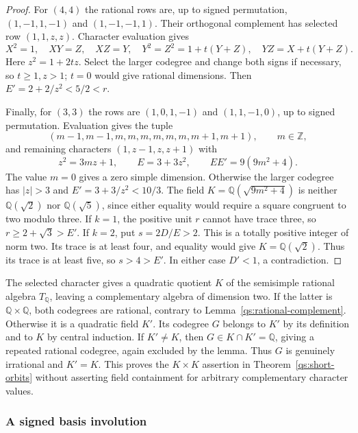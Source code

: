 \documentclass[11pt,a4paper]{article}
\theoremstyle{definition}\newtheorem{definition}[theorem]{Definition}
\theoremstyle{remark}\newtheorem{remark}[theorem]{Remark}
\newcommand{\Q}{\mathbb Q}
\newcommand{\ZZ}{\mathbb Z}
\numberwithin{equation}{section}
\begin{document}
\begin{proof}
For $(4,4)$ the rational rows are, up to signed permutation,
$(1,-1,1,-1)$ and $(1,-1,-1,1)$. Their orthogonal complement has
selected row $(1,1,z,z)$. Character evaluation gives
\[
 X^2=1,\quad XY=Z,\quad XZ=Y,\quad
 Y^2=Z^2=1+t(Y+Z),\quad YZ=X+t(Y+Z).
\]
Here $z^2=1+2tz$. Select the larger codegree and change both signs
if necessary, so $t\ge1,z>1$; $t=0$ would give rational dimensions.
Then $E'=2+2/z^2<5/2<r$.

Finally, for $(3,3)$ the rows are
$(1,0,1,-1)$ and $(1,1,-1,0)$, up to signed permutation.
Evaluation gives the tuple
\[
(m-1,m-1,m,m,m,m,m,m,m+1,m+1),\qquad m\in\ZZ,
\]
and remaining characters $(1,z-1,z,z+1)$ with
\begin{equation}\label{quad:eq:rational-three-normal-form}
 z^2=3mz+1,\qquad E=3+3z^2,\qquad EE'=9(9m^2+4).
\end{equation}
The value $m=0$ gives a zero simple dimension. Otherwise the larger
codegree has $|z|>3$ and $E'=3+3/z^2<10/3$.
The field $K=\Q(\sqrt{9m^2+4})$ is neither
$\Q(\sqrt2)$ nor $\Q(\sqrt5)$, since either equality
would require a square congruent to two modulo three.
If $k=1$, the positive unit $r$ cannot have trace three, so
$r\ge2+\sqrt3>E'$. If $k=2$, put $s=2D/E>2$.
This is a totally positive integer of norm two. Its trace is at least
four, and equality would give $K=\Q(\sqrt2)$. Thus its trace
is at least five, so $s>4>E'$. In either case $D'<1$, a contradiction.
\end{proof}

The selected character gives a quadratic quotient $K$ of the semisimple
rational algebra $T_{\Q}$, leaving a complementary algebra of
dimension two. If the latter is $\Q\times\Q$, both codegrees
are rational, contrary to Lemma~\ref{qs:rational-complement}. Otherwise
it is a quadratic field $K'$. Its codegree $G$ belongs to $K'$ by its
definition and to $K$ by central induction. If $K'\ne K$, then
$G\in K\cap K'=\Q$, giving a repeated rational codegree,
again excluded by the lemma. Thus $G$ is genuinely irrational and
$K'=K$. This proves the $K\times K$ assertion in
Theorem~\ref{qs:short-orbits} without asserting field containment
for arbitrary complementary character values.

\subsubsection{A signed basis involution}
\end{document}
